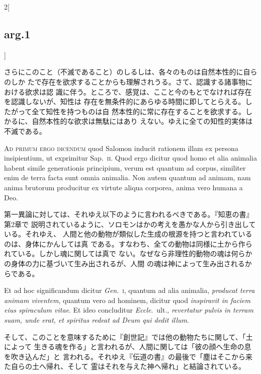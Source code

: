 \documentclass[paper=a4paper,fontsize=10pt,jafontsize=9pt,titlepage]{jlreq}
\begin{document}
\begin{paracol}{2}[\subsection{arg.1}]
\switchcolumn

 さらにこのこと（不滅であること）のしるしは、各々のものは自然本性的に自らのしか
 たで存在を欲求することからも理解されうる。さて、認識する諸事物における欲求は認
 識に伴う。ところで、感覚は、ここと今のもとでなければ存在を認識しないが、知性は
 存在を無条件的にあらゆる時間に即してとらえる。したがって全て知性を持つものは自
 然本性的に常に存在することを欲求する。しかるに、自然本性的な欲求は無駄にはあり
 えない。ゆえに全ての知性的実体は不滅である。

\switchcolumn*[\subsection{ad 1}]

{\scshape Ad primum ergo dicendum} quod Salomon inducit rationem illam ex
persona insipientium, ut exprimitur Sap.~{\scshape ii}. Quod ergo dicitur quod
homo et alia animalia habent simile generationis principium, verum est quantum
ad corpus, similiter enim de terra facta sunt omnia animalia. Non autem quantum
ad animam, nam anima brutorum producitur ex virtute aliqua corporea, anima vero
humana a Deo.

\switchcolumn

 第一異論に対しては、それゆえ以下のように言われるべきである。『知恵の書』第2章で
 説明されているように、ソロモンはかの考えを愚かな人から引き出している。それゆえ、
 人間と他の動物が類似した生成の根源を持つと言われているのは、身体にかんしては真
 である。すなわち、全ての動物は同様に土から作られている。しかし魂に関しては真で
 ない。なぜなら非理性的動物の魂は何らかの身体の力に基づいて生み出されるが、人間
 の魂は神によって生み出されるからである。

\switchcolumn*


Et ad hoc significandum dicitur {\itshape Gen}.~{\scshape i}, quantum ad alia
animalia, {\itshape producat terra animam viventem}, quantum vero ad hominem,
dicitur quod {\itshape inspiravit in faciem eius spiraculum vitae}. Et ideo
concluditur {\itshape Eccle}.~ult., {\itshape revertatur pulvis in terram suam,
unde erat, et spiritus redeat ad Deum qui dedit illum}.

\switchcolumn

そして、このことを意味するために『創世記』では他の動物たちに関して、「土によって
 生きる魂を作る」と言われるが、人間に関しては「彼の顔へ生命の息を吹き込んだ」と
 言われる。それゆえ『伝道の書』の最後で「塵はそこから来た自らの土へ帰れ、そして
 霊はそれを与えた神へ帰れ」と結論されている。


\end{paracol}
\end{document}
